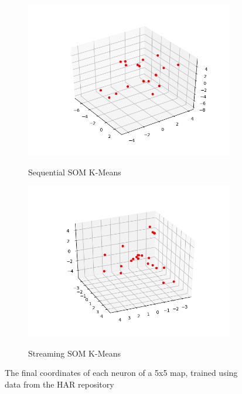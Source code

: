 \documentclass{l4proj}
\begin{document}
\begin{figure}[H]
\label{som-real}
\begin{subfigure}{.5\textwidth}
  \includegraphics[width=0.95\linewidth]{images/result16}
  \label{fig:res16}
  \caption{Sequential SOM K-Means}
\end{subfigure}%
\begin{subfigure}{.5\textwidth}
  \includegraphics[width=0.95\linewidth]{images/result17}
  \label{fig:res17}
  \caption{Streaming SOM K-Means}
\end{subfigure}
\caption{The final coordinates of each neuron of a 5x5 map, trained using data from the HAR repository}
\end{figure}

\end{document}
